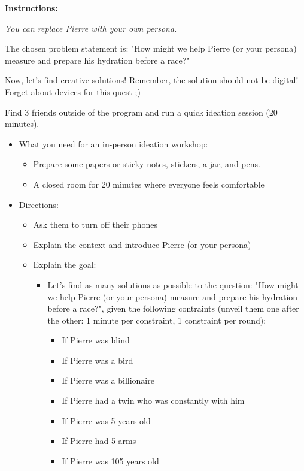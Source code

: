 \makeheaderfiles

\textbf{Instructions:}

\emph{You can replace Pierre with your own persona.}

The chosen problem statement is: "How might we help Pierre (or your persona) measure and prepare his hydration before a race?"

Now, let's find creative solutions! Remember, the solution should not be digital! Forget about devices for this quest ;)

Find 3 friends outside of the program and run a quick ideation session (20 minutes).

\begin{itemize}
\item What you need for an in-person ideation workshop:
\begin{itemize}
\item Prepare some papers or sticky notes, stickers, a jar, and pens.
\item A closed room for 20 minutes where everyone feels comfortable
\end{itemize}
\item Directions:
\begin{itemize}
\item Ask them to turn off their phones
\item Explain the context and introduce Pierre (or your persona)
\item Explain the goal:
\begin{itemize}
\item Let's find as many solutions as possible to the question: "How might we help Pierre (or your persona) measure and prepare his hydration before a race?", given the following contraints (unveil them one after the other: 1 minute per constraint, 1 constraint per round):
\begin{itemize}
\item If Pierre was blind
\item If Pierre was a bird
\item If Pierre was a billionaire
\item If Pierre had a twin who was constantly with him
\item If Pierre was 5 years old
\item If Pierre had 5 arms
\item If Pierre was 105 years old

\end{itemize}
\end{itemize}
\end{itemize}
\end{itemize}
